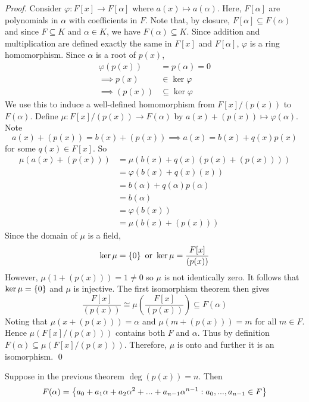 \begin{proof}
    Consider $\varphi: F[x] \to F[\alpha]$ where $a(x) \mapsto a(\alpha)$. Here, $F[\alpha]$ are polynomials in $\alpha$ with coefficients in $F$. Note that, by closure, $F[\alpha] \subseteq F(\alpha)$ and since $F \subseteq K$ and $\alpha \in K$, we have $F(\alpha) \subseteq K$. Since addition and multiplication are defined exactly the same in $F[x]$ and $F[\alpha]$, $\varphi$ is a ring homomorphism. Since $\alpha$ is a root of $p(x)$,
    \begin{align*}
        \varphi(p(x)) &= p(\alpha) = 0 \\
        \implies p(x) &\in \ker \varphi \\
        \implies \left(p(x)\right) &\subseteq \ker \varphi
    \end{align*}
    We use this to induce a well-defined homomorphism from $F[x]/(p(x))$ to $F(\alpha)$. Define $\mu: F[x]/(p(x)) \to F(\alpha)$ by $a(x) + (p(x)) \mapsto \varphi(\alpha)$. Note
    $$a(x) + (p(x)) = b(x) + (p(x)) \implies a(x) = b(x) + q(x)p(x)$$
    for some $q(x) \in F[x]$. So
    \begin{align*}
        \mu(a(x) + (p(x))) &= \mu(b(x) + q(x)\left(p(x) + (p(x))\right)) \\
        &= \varphi(b(x) + q(x)(x)) \\
        &= b(\alpha) + q(\alpha)p(\alpha) \\
        &= b(\alpha) \\
        &= \varphi(b(x)) \\
        &= \mu(b(x) + (p(x)))
    \end{align*}
    Since the domain of $\mu$ is a field,
    $$\ker \mu = \left\{0\right\} \text{ or } \ker \mu = \frac{F[x]}{(p(x))}$$
    However, $\mu(1+(p(x))) = 1 \neq 0$ so $\mu$ is not identically zero. It follows that $\ker \mu = \left\{0\right\}$ and $\mu$ is injective. The first isomorphism theorem then gives
    $$\frac{F[x]}{(p(x))}\cong \mu \left(\frac{F[x]}{(p(x))}\right) \subseteq F(\alpha)$$
    Noting that $\mu(x + (p(x))) = \alpha$ and $\mu(m + (p(x))) = m$ for all $m \in F$. Hence $\mu\left(F[x]/(p(x))\right)$ contains both $F$ and $\alpha$. Thus by definition $F(\alpha) \subseteq \mu\left(F[x]/(p(x))\right)$. Therefore, $\mu$ is onto and further it is an isomorphism.
    \qed
\end{proof}

\begin{corollary}
    Suppose in the previous theorem $\deg\left(p(x)\right) = n$. Then 
    $$F(\alpha) = \left\{a_0 + a_1\alpha + a_2\alpha^2+...+a_{n-1}\alpha^{n-1} : a_0, ..., a_{n-1} \in F\right\}$$
\end{corollary}

